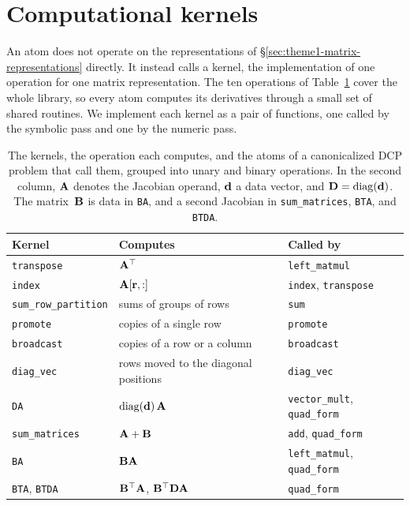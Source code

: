 \section{Computational kernels}\label{sec:theme1-kernels}
An atom does not operate on the representations of
\S\ref{sec:theme1-matrix-representations} directly. It instead calls a kernel, the
implementation of one operation for one matrix representation. The ten operations of
Table~\ref{tab:kernel-operations} cover the whole library, so every atom computes its
derivatives through a small set of shared routines.
We implement each kernel as a pair of functions, one called by the symbolic pass and one
by the numeric pass.
\begin{table}[tb]
\caption{The kernels, the operation each computes, and the atoms of a canonicalized DCP
problem that call them, grouped into unary and binary operations. In the second column,
$\mathbf{A}$ denotes the Jacobian operand, $\mathbf{d}$ a data vector, and
$\mathbf{D} = \mathop{\mathrm{diag}}(\mathbf{d})$. The matrix~$\mathbf{B}$ is data in \texttt{BA}, and a second
Jacobian in \texttt{sum\_matrices}, \texttt{BTA}, and \texttt{BTDA}.}
\label{tab:kernel-operations}
\centering
\begin{tabular}{lll}
\toprule
Kernel & Computes & Called by \\
\midrule
\texttt{transpose} & $\mathbf{A}^\top$ & \texttt{left\_matmul} \\
\texttt{index} & $\mathbf{A}[\mathbf{r}, :]$ & \texttt{index}, \texttt{transpose} \\
\texttt{sum\_row\_partition} & sums of groups of rows & \texttt{sum} \\
\texttt{promote} & copies of a single row & \texttt{promote} \\
\texttt{broadcast} & copies of a row or a column & \texttt{broadcast} \\
\texttt{diag\_vec} & rows moved to the diagonal positions & \texttt{diag\_vec} \\
\texttt{DA} & $\mathop{\mathrm{diag}}(\mathbf{d})\, \mathbf{A}$ & \texttt{vector\_mult}, \texttt{quad\_form} \\
\midrule
\texttt{sum\_matrices} & $\mathbf{A} + \mathbf{B}$ & \texttt{add}, \texttt{quad\_form} \\
\texttt{BA} & $\mathbf{B} \mathbf{A}$ & \texttt{left\_matmul}, \texttt{quad\_form} \\
\texttt{BTA}, \texttt{BTDA} & $\mathbf{B}^\top \mathbf{A}$, $\mathbf{B}^\top \mathbf{D} \mathbf{A}$ &
\texttt{quad\_form} \\
\bottomrule
\end{tabular}
\end{table}

